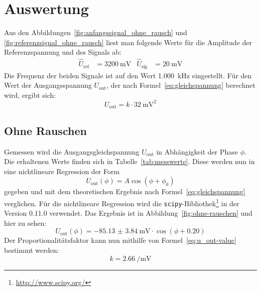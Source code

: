 
\section{Auswertung}

Aus den Abbildungen~\ref{fig:anfangssignal_ohne_rausch} und
\ref{fig:referenzsignal_ohne_rausch} liest man folgende Werte für die
Amplitude der Referenzspannung und des Signals ab:
%
\begin{align}
  \widehat{U}_\text{ref} &= \SI{3200}{\milli\volt} &
  \widehat{U}_\text{sig} &= \SI{20}{\milli\volt}
\end{align}
%
Die Frequenz der beiden Signale ist auf den Wert \SI{1.000}{\kilo\hertz}
eingestellt. Für den Wert der Ausgangsspannung $U_\text{out}$, der nach
Formel~\eqref{eq:gleichspannung} berechnet wird, ergibt sich:
\begin{equation}
  \label{eq:u_out-value}
  U_\text{out} = k \cdot \SI{32}{\milli\volt\squared}
\end{equation}

\subsection{Ohne Rauschen}

Gemessen wird die Ausgangsgleichspannung $U_\text{out}$ in Abhängigkeit
der Phase $\phi$. Die erhaltenen Werte finden sich in
Tabelle~\ref{tab:messwerte}. Diese werden nun in eine nichtlineare
Regression der Form
%
\begin{equation}
  \label{eq:cos-regress}
  U_\text{out}(\phi) = A\cos(\phi+\phi_0)
\end{equation}
%
gegeben und mit dem theoretischen Ergebnis nach
Formel~\eqref{eq:gleichspannung} verglichen. Für die nichtlineare
Regression wird die
\texttt{scipy}-Bibliothek\footnote{\url{http://www.scipy.org/}} in der
Version 0.11.0 verwendet. Das Ergebnis ist in
Abbildung~\ref{fig:ohne-rauschen} und hier zu sehen:
%
\begin{equation}
  \label{eq:cos-regress-result}
  U_\text{out}(\phi) = \SI{-85.13(384)}{\milli\volt} \cdot
  \cos(\phi + \num{0.20})
\end{equation}
%
Der Proportionalitätsfaktor kann nun mithilfe von
Formel~\eqref{eq:u_out-value} bestimmt werden:
%
\begin{equation}
  \label{eq:propt-value}
  k = \SI{2.66}{\per\milli\volt}
\end{equation}

